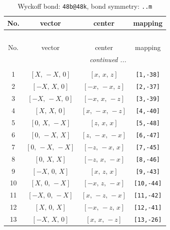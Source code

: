 \documentclass[fleqn,8pt]{jsarticle}
\begin{document}
\begin{longtable}{cccc}
\caption{Wyckoff bond: {\tt 48b@48k}, bond symmetry: {\tt ..m}}
 \\
 \hline \hline
No. & vector & center & mapping \\ \hline \endfirsthead

\multicolumn{3}{l}{\tablename\ \thetable{}} \\
 \hline \hline
No. & vector & center & mapping \\ \hline \endhead

 \hline \hline
\multicolumn{3}{r}{\footnotesize\it continued ...} \\ \endfoot

 \hline \hline
\multicolumn{3}{r}{} \\ \endlastfoot

1 & $\left[ X,\, - X,\, 0 \right]$ & $\left[ x,\, x,\, z \right]$ & {\tt [1,-38]} \\ \hline
2 & $\left[ - X,\, X,\, 0 \right]$ & $\left[ - x,\, - x,\, z \right]$ & {\tt [2,-37]} \\ \hline
3 & $\left[ - X,\, - X,\, 0 \right]$ & $\left[ - x,\, x,\, - z \right]$ & {\tt [3,-39]} \\ \hline
4 & $\left[ X,\, X,\, 0 \right]$ & $\left[ x,\, - x,\, - z \right]$ & {\tt [4,-40]} \\ \hline
5 & $\left[ 0,\, X,\, - X \right]$ & $\left[ z,\, x,\, x \right]$ & {\tt [5,-48]} \\ \hline
6 & $\left[ 0,\, - X,\, X \right]$ & $\left[ z,\, - x,\, - x \right]$ & {\tt [6,-47]} \\ \hline
7 & $\left[ 0,\, - X,\, - X \right]$ & $\left[ - z,\, - x,\, x \right]$ & {\tt [7,-45]} \\ \hline
8 & $\left[ 0,\, X,\, X \right]$ & $\left[ - z,\, x,\, - x \right]$ & {\tt [8,-46]} \\ \hline
9 & $\left[ - X,\, 0,\, X \right]$ & $\left[ x,\, z,\, x \right]$ & {\tt [9,-43]} \\ \hline
10 & $\left[ X,\, 0,\, - X \right]$ & $\left[ - x,\, z,\, - x \right]$ & {\tt [10,-44]} \\ \hline
11 & $\left[ - X,\, 0,\, - X \right]$ & $\left[ x,\, - z,\, - x \right]$ & {\tt [11,-42]} \\ \hline
12 & $\left[ X,\, 0,\, X \right]$ & $\left[ - x,\, - z,\, x \right]$ & {\tt [12,-41]} \\ \hline
13 & $\left[ - X,\, X,\, 0 \right]$ & $\left[ x,\, x,\, - z \right]$ & {\tt [13,-26]} \\ \hline

\end{longtable}
\end{document}
